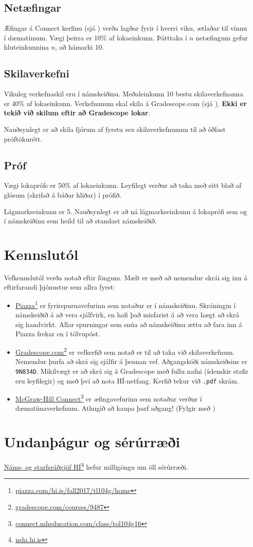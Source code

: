 \documentclass[justified, nobib]{tufte-handout}
\begin{document}
\subsection{Netæfingar}
Æfingar á Connect kerfinu (sjá ) verða lagðar fyrir í hverri viku, ætlaðar til vinnu í dæmatímum. Vægi þeirra er 10\% af lokaeinkunn. Þátttaka í $n$ netæfingum gefur hluteinkunnina $n$, að hámarki 10.

\subsection{Skilaverkefni}
Vikuleg verkefnaskil eru í námskeiðinu. Meðaleinkunn 10 bestu skilaverkefnanna er 40\% af lokaeinkunn. Verkefnunum skal skila á Gradescope.com (sjá ). \textbf{Ekki er tekið við skilum eftir að Gradescope lokar}.

Nauðsynlegt er að skila fjórum af fyrstu sex skilaverkefnunum til að öðlast próftökurétt.
\subsection{Próf}
Vægi lokaprófs er 50\% af lokaeinkunn. Leyfilegt verður að taka með eitt blað af glósum (skrifað á báðar hliðar) í prófið.

Lágmarkseinkunn er 5. Nauðsynlegt er að ná lágmarkseinkunn á lokaprófi sem og í námskeiðinu sem heild til að standast námskeiðið. 

\section{Kennslutól}
\label{sec:tools}
Vefkennslutól verða notað eftir föngum. Mælt er með að nemendur skrái sig inn á eftirfarandi þjónustur sem allra fyrst:
\begin{itemize}
 \item \href{piazza.com/hi.is/fall2017/tl104g/home}{Piazza}\footnote{\url{piazza.com/hi.is/fall2017/tl104g/home}} er fyrirspurnavefurinn sem notaður er í námskeiðinu. Skráningin í námskeiðið á að vera sjálfvirk, en hafi það misfarist á að vera hægt að skrá sig handvirkt. Allar spurningar sem snúa að námskeiðinu ættu að fara inn á Piazza frekar en í tölvupóst.
 \item \href{https://gradescope.com/courses/9487}{Gradescope.com}\footnote{\url{gradescope.com/courses/9487}} er vefkerfið sem notað er til að taka við skilaverkefnum. Nemendur þurfa að skrá sig sjálfir á þennan vef. Aðgangskóði námskeiðsins er \texttt{9N834D}. Mikilvægt er að skrá sig á Gradescope með fullu nafni (íslenskir stafir eru leyfilegir) og með því að nota HÍ-netfang. Kerfið tekur við \texttt{.pdf} skrám.
 \item \href{http://connect.mheducation.com/class/tol104g16}{McGraw-Hill Connect}\footnote{\url{connect.mheducation.com/class/tol104g16}} er æfingavefurinn sem notaður verður í dæmatímaverkefnum. Athugið að kaupa þarf aðgang! (Fylgir með ) %
\end{itemize}

\section{Undanþágur og sérúrræði}
\href{http://nshi.hi.is/}{Náms- og starfsráðgjöf HÍ}\footnote{\url{nshi.hi.is}} hefur milligöngu um öll sérúrræði.
\end{document}
